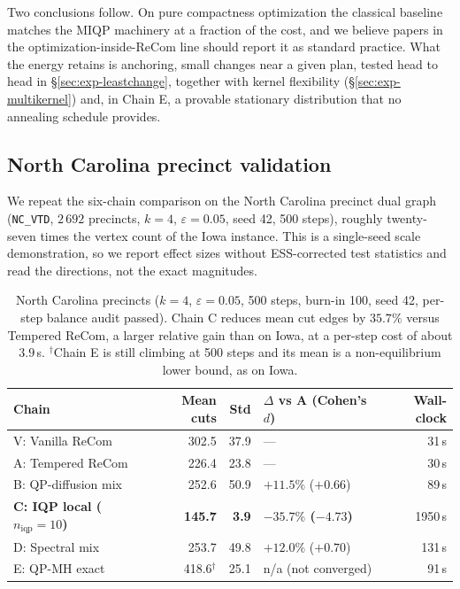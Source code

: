 \documentclass[11pt]{article}
\begin{document}
Two conclusions follow. On pure compactness optimization the classical
baseline matches the MIQP machinery at a fraction of the cost, and we
believe papers in the optimization-inside-ReCom line should report
it as standard practice. What the energy retains is anchoring, small
changes near a given plan, tested head to head in
\S\ref{sec:exp-leastchange}, together with kernel flexibility
(\S\ref{sec:exp-multikernel}) and, in Chain E, a provable stationary
distribution that no annealing schedule provides.

\subsection{North Carolina precinct validation}\label{sec:exp-nc}
We repeat the six-chain comparison on the North Carolina precinct dual
graph (\texttt{NC\_VTD}, $2\,692$ precincts, $k = 4$,
$\varepsilon = 0.05$, seed 42, 500 steps), roughly twenty-seven times
the vertex count of the Iowa instance. This is a single-seed scale
demonstration, so we report effect sizes without ESS-corrected test
statistics and read the directions, not the exact magnitudes.

\begin{table}[H]
\centering
\small
\begin{tabular}{lrrlr}
\toprule
Chain & Mean cuts & Std & $\Delta$ vs A (Cohen's $d$) & Wall-clock \\
\midrule
V: Vanilla ReCom    & 302.5 & 37.9 & ---                & 31\,s \\
A: Tempered ReCom   & 226.4 & 23.8 & ---                & 30\,s \\
B: QP-diffusion mix & 252.6 & 50.9 & $+11.5\%$ ($+0.66$) & 89\,s \\
\textbf{C: IQP local ($n_{\mathrm{iqp}} = 10$)}
                    & \textbf{145.7} & \textbf{3.9}
                    & \textbf{$-35.7\%$ ($-4.73$)} & 1950\,s \\
D: Spectral mix     & 253.7 & 49.8 & $+12.0\%$ ($+0.70$) & 131\,s \\
E: QP-MH exact      & 418.6$^{\dagger}$ & 25.1 & n/a (not converged) & 91\,s \\
\bottomrule
\end{tabular}
\caption{North Carolina precincts ($k = 4$, $\varepsilon = 0.05$,
  500 steps, burn-in 100, seed 42, per-step balance audit passed).
  Chain C reduces mean cut edges by $35.7\%$ versus Tempered ReCom,
  a larger relative gain than on Iowa, at a per-step cost of about
  $3.9$\,s. $^{\dagger}$Chain E is still climbing at 500 steps and its
  mean is a non-equilibrium lower bound, as on Iowa.}\label{tab:nc-headline}
\end{table}
\end{document}
